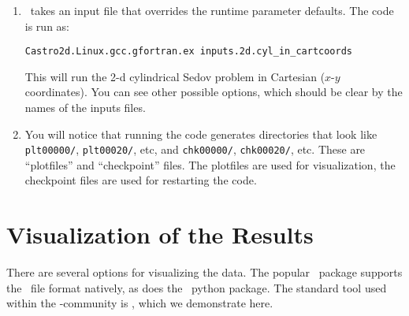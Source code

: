 \begin{enumerate}

\item \castro\ takes an input file that overrides the runtime parameter defaults.
  The code is run as:
\begin{verbatim}
Castro2d.Linux.gcc.gfortran.ex inputs.2d.cyl_in_cartcoords
\end{verbatim}

This will run the 2-d cylindrical Sedov problem in Cartesian ($x$-$y$
coordinates).  You can see other possible options, which should be
clear by the names of the inputs files.

\item You will notice that running the code generates directories that
  look like {\tt plt00000/}, {\tt plt00020/}, etc, and {\tt chk00000/},
  {\tt chk00020/}, etc. These are ``plotfiles'' and ``checkpoint''
  files. The plotfiles are used for visualization, the checkpoint
  files are used for restarting the code.

\end{enumerate}

\section{Visualization of the Results}

There are several options for visualizing the data.  The popular
\visit\ package supports the \boxlib\ file format natively, as does
the \yt\ python package.  The standard tool used within the
\boxlib-community is \amrvis, which we demonstrate here.

